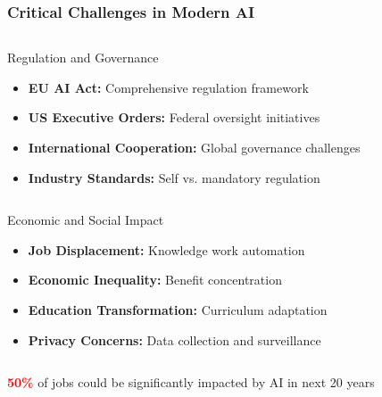 \documentclass{beamer}
\begin{document}
\begin{frame}
    \frametitle{Critical Challenges in Modern AI}
        
        \begin{column}{0.48\textwidth}
            \begin{exampleblock}{Regulation and Governance}
                \begin{itemize}
                    \item \textbf{EU AI Act:} Comprehensive regulation framework
                    \item \textbf{US Executive Orders:} Federal oversight initiatives
                    \item \textbf{International Cooperation:} Global governance challenges
                    \item \textbf{Industry Standards:} Self vs. mandatory regulation
                \end{itemize}
            \end{exampleblock}
        \end{column}
        \begin{column}{0.48\textwidth}
            \begin{alertblock}{Economic and Social Impact}
                \begin{itemize}
                    \item \textbf{Job Displacement:} Knowledge work automation
                    \item \textbf{Economic Inequality:} Benefit concentration
                    \item \textbf{Education Transformation:} Curriculum adaptation
                    \item \textbf{Privacy Concerns:} Data collection and surveillance
                \end{itemize}
            \end{alertblock}
        \end{column}   
    \begin{center}
        \textcolor{red}{\textbf{50\%}} of jobs could be significantly impacted by AI in next 20 years
    \end{center}
    
\end{frame}
\end{document}
